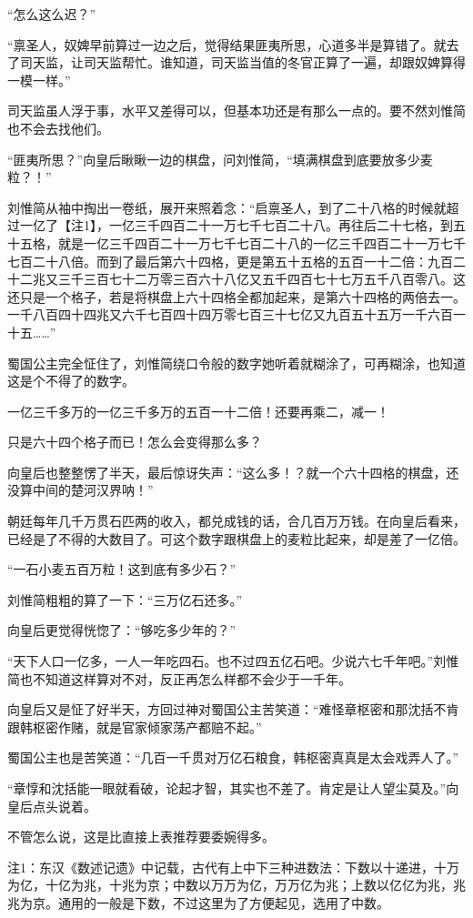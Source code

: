 “怎么这么迟？”

“禀圣人，奴婢早前算过一边之后，觉得结果匪夷所思，心道多半是算错了。就去了司天监，让司天监帮忙。谁知道，司天监当值的冬官正算了一遍，却跟奴婢算得一模一样。”

司天监虽人浮于事，水平又差得可以，但基本功还是有那么一点的。要不然刘惟简也不会去找他们。

“匪夷所思？”向皇后瞅瞅一边的棋盘，问刘惟简，“填满棋盘到底要放多少麦粒？！”

刘惟简从袖中掏出一卷纸，展开来照着念：“启禀圣人，到了二十八格的时候就超过一亿了【注1】，一亿三千四百二十一万七千七百二十八。再往后二十七格，到五十五格，就是一亿三千四百二十一万七千七百二十八的一亿三千四百二十一万七千七百二十八倍。而到了最后第六十四格，更是第五十五格的五百一十二倍：九百二十二兆又三千三百七十二万零三百六十八亿又五千四百七十七万五千八百零八。这还只是一个格子，若是将棋盘上六十四格全都加起来，是第六十四格的两倍去一。一千八百四十四兆又六千七百四十四万零七百三十七亿又九百五十五万一千六百一十五……”

蜀国公主完全怔住了，刘惟简绕口令般的数字她听着就糊涂了，可再糊涂，也知道这是个不得了的数字。

一亿三千多万的一亿三千多万的五百一十二倍！还要再乘二，减一！

只是六十四个格子而已！怎么会变得那么多？

向皇后也整整愣了半天，最后惊讶失声：“这么多！？就一个六十四格的棋盘，还没算中间的楚河汉界呐！”

朝廷每年几千万贯石匹两的收入，都兑成钱的话，合几百万万钱。在向皇后看来，已经是了不得的大数目了。可这个数字跟棋盘上的麦粒比起来，却是差了一亿倍。

“一石小麦五百万粒！这到底有多少石？”

刘惟简粗粗的算了一下：“三万亿石还多。”

向皇后更觉得恍惚了：“够吃多少年的？”

“天下人口一亿多，一人一年吃四石。也不过四五亿石吧。少说六七千年吧。”刘惟简也不知道这样算对不对，反正再怎么样都不会少于一千年。

向皇后又是怔了好半天，方回过神对蜀国公主苦笑道：“难怪章枢密和那沈括不肯跟韩枢密作赌，就是官家倾家荡产都赔不起。”

蜀国公主也是苦笑道：“几百一千贯对万亿石粮食，韩枢密真真是太会戏弄人了。”

“章惇和沈括能一眼就看破，论起才智，其实也不差了。肯定是让人望尘莫及。”向皇后点头说着。

不管怎么说，这是比直接上表推荐要委婉得多。

注1：东汉《数述记遗》中记载，古代有上中下三种进数法：下数以十递进，十万为亿，十亿为兆，十兆为京；中数以万万为亿，万万亿为兆；上数以亿亿为兆，兆兆为京。通用的一般是下数，不过这里为了方便起见，选用了中数。

